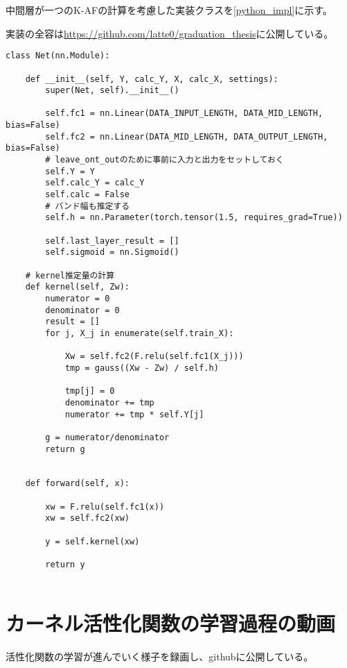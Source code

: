 中間層が一つのK-AFの計算を考慮した実装クラスを\ref{python_impl}に示す。

実装の全容は\href{https://github.com/latte0/graduation\_thesis}{https://github.com/latte0/graduation\_thesis}に公開している。

\begin{lstlisting}[caption=Pytorchを用いたK-AFの計算用のクラス,label=python_impl]
class Net(nn.Module):

    def __init__(self, Y, calc_Y, X, calc_X, settings):
        super(Net, self).__init__()

        self.fc1 = nn.Linear(DATA_INPUT_LENGTH, DATA_MID_LENGTH, bias=False)
        self.fc2 = nn.Linear(DATA_MID_LENGTH, DATA_OUTPUT_LENGTH, bias=False)
        # leave_ont_outのために事前に入力と出力をセットしておく
        self.Y = Y
        self.calc_Y = calc_Y
        self.calc = False
        # バンド幅も推定する
        self.h = nn.Parameter(torch.tensor(1.5, requires_grad=True))

        self.last_layer_result = []
        self.sigmoid = nn.Sigmoid()

    # kernel推定量の計算
    def kernel(self, Zw):
        numerator = 0
        denominator = 0
        result = []
        for j, X_j in enumerate(self.train_X):

            Xw = self.fc2(F.relu(self.fc1(X_j)))
            tmp = gauss((Xw - Zw) / self.h)

            tmp[j] = 0
            denominator += tmp
            numerator += tmp * self.Y[j]

        g = numerator/denominator
        return g


    def forward(self, x):

        xw = F.relu(self.fc1(x))
        xw = self.fc2(xw)

        y = self.kernel(xw)

        return y


\end{lstlisting}


\chapter{カーネル活性化関数の学習過程の動画}
\label{appendix:movie}

活性化関数の学習が進んでいく様子を録画し、githubに公開している。



